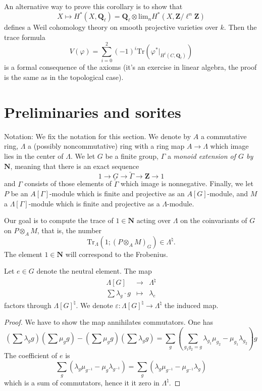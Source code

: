 An alternative way to prove this corollary is to show that
$$
X \mapsto H^* (X, \mathbf{Q}_\ell) = \mathbf{Q}_\ell \otimes \text{lim}_n
H^*(X, \mathbf{Z}/\ell^n\mathbf{Z})
$$
defines a Weil cohomology theory on smooth projective varieties over $k$. Then
the trace formula
$$
V(\varphi) = \sum_{i=0}^2 (-1)^i \text{Tr}(\varphi^* |_{H^i
(C,\mathbf{Q}_\ell)})
$$
is a formal consequence of the axioms (it's an exercise in linear algebra, the
proof is the same as in the topological case).




\section{Preliminaries and sorites}
\label{section-preliminaries}

\noindent
Notation:
We fix the notation for this section. We denote by $A$ a commutative ring,
$\Lambda$ a (possibly noncommutative) ring with a ring map $A\to \Lambda$ which
image lies in the center of $\Lambda$. We let $G$ be a finite group, $\Gamma$ a
{\it monoid extension of $G$ by $\mathbf{N}$}, meaning that there is an exact
sequence
$$
1\to G\to \tilde\Gamma\to \mathbf{Z}\to 1
$$
and $\Gamma$ consists of those elements of $\tilde\Gamma$ which image is
nonnegative. Finally, we let $P$ be an $A[\Gamma]$-module which is finite and
projective as an $A[G]$-module, and $M$ a $\Lambda[\Gamma]$-module which is
finite and projective as a $\Lambda$-module.

\medskip\noindent
Our goal is to compute the trace of $1 \in \mathbf{N}$ acting over $\Lambda$
on the coinvariants of $G$ on $P\otimes_A M$, that is, the number
$$
\text{Tr}_{\Lambda}\left(1; \left(P\otimes_A M\right)_G\right) \in
\Lambda^\natural.
$$
The element $1\in \mathbf{N}$ will correspond to the Frobenius.

\begin{lemma}
\label{lemma-epsilon}
Let $e\in G$ denote the neutral element. The map
$$
\begin{matrix}
\Lambda[G] & \longrightarrow & \Lambda^{\natural}\\
\sum \lambda_g\cdot g &\longmapsto& \lambda_e
\end{matrix}
$$
factors through $\Lambda[G]^\natural$. We denote $\varepsilon:
\Lambda[G]^\natural\to \Lambda^\natural$ the induced map.
\end{lemma}

\begin{proof}
We have to show the map annihilates commutators. One has
$$
\left(\sum\lambda_g g\right)\left(\sum\mu_g g\right)-\left(\sum \mu_g
g\right)\left(\sum\lambda_g g\right)
= \sum_g\left(\sum_{g_1g_2=g}
\lambda_{g_1}\mu_{g_2}-\mu_{g_1}\lambda_{g_2}\right)g
$$
The coefficient of $e$ is
$$
\sum_g\left(\lambda_g\mu_{g^{-1}}-\mu_g\lambda_{g^{-1}}\right) =
\sum_g\left(\lambda_g\mu_{g^{-1}}-\mu_{g^{-1}}\lambda_g\right)
$$
which is a sum of commutators, hence it it zero in $\Lambda^\natural$.
\end{proof}

